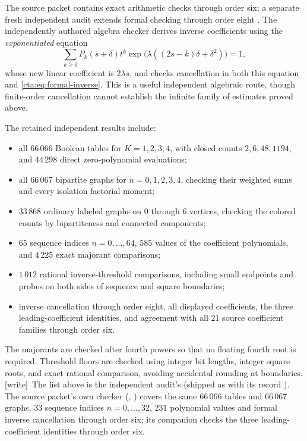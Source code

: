 \documentclass[11pt]{article}
\theoremstyle{definition}
\theoremstyle{remark}
\newcommand{\la}{\lambda}
\newcommand{\wtag}{\textup{[write]}}
\begin{document}
The source packet contains exact arithmetic checks through order six;
a separate fresh independent audit extends formal checking through order
eight \cite{source,audit}. The independently authored algebra checker
derives inverse coefficients using the \emph{exponentiated} equation
\begin{equation}\label{cta:eq:alternative}
 \sum_{k\geq0}P_k(s+\delta)t^k
 \exp\!\bigl(\la((2s-k)\delta+\delta^2)\bigr)=1,
\end{equation}
whose new linear coefficient is $2\la s$, and checks cancellation in both
this equation and \eqref{cta:eq:formal-inverse}. This is a useful independent
algebraic route, though finite-order cancellation cannot establish the
infinite family of estimates proved above.

The retained independent results include:
\begin{itemize}
\item all $66\,066$ Boolean tables for $K=1,2,3,4$, with closed counts
$2,6,48,1194$, and $44\,298$ direct zero-polynomial evaluations;
\item all $66\,067$ bipartite graphs for $n=0,1,2,3,4$, checking their
weighted sums and every isolation factorial moment;
\item $33\,868$ ordinary labeled graphs on $0$ through $6$ vertices,
checking the colored counts by bipartiteness and connected components;
\item $65$ sequence indices $n=0,\ldots,64$, $585$ values of the
coefficient polynomials, and $4\,225$ exact majorant comparisons;
\item $1\,012$ rational inverse-threshold comparisons, including small
endpoints and probes on both sides of sequence and square boundaries;
\item inverse cancellation through order eight, all displayed
coefficients, the three leading-coefficient identities, and agreement
with all $21$ source coefficient families through order six.
\end{itemize}
The majorants are checked after fourth powers so that no floating fourth
root is required. Threshold floors are checked using integer bit lengths,
integer square roots, and exact rational comparison, avoiding accidental
rounding at boundaries.
\wtag\ The list above is the independent audit's (shipped as
 with its record
). The source packet's own
checker (,
) covers the same $66\,066$ tables and
$66\,067$ graphs, $33$ sequence indices $n=0,\ldots,32$, $231$ polynomial
values and formal inverse cancellation through order six; its companion
 checks the three
leading-coefficient identities through order six.
\end{document}
